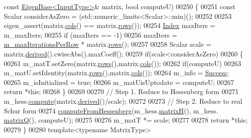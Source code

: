 \begin{DoxyCode}
{      const} \hyperlink{group___core___module_struct_eigen_1_1_eigen_base}{EigenBase<InputType>}& matrix, \textcolor{keywordtype}{bool} computeU)
00250 \{
00251   \textcolor{keyword}{const} Scalar considerAsZero = (std::numeric\_limits<Scalar>::min)();
00252 
00253   eigen\_assert(matrix.\hyperlink{group___core___module_a7b0b45c7351847696c911ce8aa2abbdb}{cols}() == matrix.\hyperlink{group___core___module_a8141320ba8df384426c298b32b000d8e}{rows}());
00254   \hyperlink{group___eigenvalues___module_a8bd4653e2d9569a44ecc95e746422d3f}{Index} maxIters = m\_maxIters;
00255   \textcolor{keywordflow}{if} (maxIters == -1)
00256     maxIters = \hyperlink{group___eigenvalues___module_ab42163ff22cd3ad98aa2bde39b4bbc79}{m\_maxIterationsPerRow} * matrix.\hyperlink{group___core___module_a8141320ba8df384426c298b32b000d8e}{rows}();
00257 
00258   Scalar scale = matrix.\hyperlink{group___core___module_a324b16961a11d2ecfd2d1b7dd7946545}{derived}().cwiseAbs().maxCoeff();
00259   \textcolor{keywordflow}{if}(scale<considerAsZero)
00260   \{
00261     m\_matT.setZero(matrix.\hyperlink{group___core___module_a8141320ba8df384426c298b32b000d8e}{rows}(),matrix.\hyperlink{group___core___module_a7b0b45c7351847696c911ce8aa2abbdb}{cols}());
00262     \textcolor{keywordflow}{if}(computeU)
00263       m\_matU.setIdentity(matrix.\hyperlink{group___core___module_a8141320ba8df384426c298b32b000d8e}{rows}(),matrix.\hyperlink{group___core___module_a7b0b45c7351847696c911ce8aa2abbdb}{cols}());
00264     m\_info = \hyperlink{group__enums_gga85fad7b87587764e5cf6b513a9e0ee5ea52581b035f4b59c203b8ff999ef5fcea}{Success};
00265     m\_isInitialized = \textcolor{keyword}{true};
00266     m\_matUisUptodate = computeU;
00267     \textcolor{keywordflow}{return} *\textcolor{keyword}{this};
00268   \}
00269 
00270   \textcolor{comment}{// Step 1. Reduce to Hessenberg form}
00271   m\_hess.\hyperlink{group___eigenvalues___module_a239a6fd42c57aab3c0b048c47fde3004}{compute}(matrix.\hyperlink{group___core___module_a324b16961a11d2ecfd2d1b7dd7946545}{derived}()/scale);
00272 
00273   \textcolor{comment}{// Step 2. Reduce to real Schur form  }
00274   \hyperlink{group___eigenvalues___module_ac4acc917dcaddefae5f35acd2c536d65}{computeFromHessenberg}(m\_hess.\hyperlink{group___eigenvalues___module_a8e781d2e22a2304647bcf0ae913cc8ea}{matrixH}(), m\_hess.
      \hyperlink{group___eigenvalues___module_a346441e4902a58d43d698ac3da6ff791}{matrixQ}(), computeU);
00275 
00276   m\_matT *= scale;
00277   
00278   \textcolor{keywordflow}{return} *\textcolor{keyword}{this};
00279 \}
00280 \textcolor{keyword}{template}<\textcolor{keyword}{typename} MatrixType>

\end{DoxyCode}
